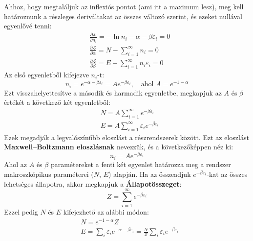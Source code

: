 \documentclass[../main.tex]{subfiles}
\begin{document}
Ahhoz, hogy megtaláljuk az inflexiós pontot (ami itt a maximum lesz), meg kell határoznunk a részleges deriváltakat az összes változó szerint, és ezeket nullával egyenlővé tenni:
\begin{equation}
    \begin{aligned}
        &\frac{\partial \mathcal{L}}{\partial n_i} = - \ln n_i - \alpha - \beta \varepsilon_i = 0 \\
        &\frac{\partial \mathcal{L}}{\partial \alpha} = N - \sum_{i = 1}^\infty n_i = 0 \\
        &\frac{\partial \mathcal{L}}{\partial \beta} = E - \sum_{i = 1}^\infty n_i \varepsilon_i = 0
    \end{aligned}
\end{equation}
Az első egyenletből kifejezve $n_i$-t:
\begin{equation}
    n_i = e^{- \alpha - \beta \varepsilon_i} = A e^{- \beta \varepsilon_i}, \quad \text{ahol } A = e^{-1 - \alpha}
\end{equation}
Ezt visszahelyettesítve a második és harmadik egyenletbe, megkapjuk az $A$ és $\beta$ értékét a következő két egyenletből:
\begin{equation}
    \begin{aligned}
        &N = A \sum_{i = 1}^\infty e^{- \beta \varepsilon_i} \\
        &E = A \sum_{i = 1}^\infty \varepsilon_i e^{- \beta \varepsilon_i}
    \end{aligned}
\end{equation}
Ezek megadják a legvalószínűbb eloszlást a részrendszerek között. Ezt az eloszlást \textbf{Maxwell–Boltzmann eloszlásnak} nevezzük, és a következőképpen néz ki:
\begin{equation}
    n_i = A e^{- \beta \varepsilon_i}
\end{equation}
Ahol az $A$ és $\beta$ paramétereket a fenti két egyenlet határozza meg a rendszer makroszkópikus paraméterei ($N$, $E$) alapján.
Ha az összeadjuk $e^{- \beta \varepsilon_i}$-kat az összes lehetséges állapotra, akkor megkapjuk a \textbf{Állapotösszeget}:
\begin{equation}
    Z = \sum_{i = 1}^\infty e^{- \beta \varepsilon_i}
\end{equation}
Ezzel pedig $N$ és $E$ kifejezhető az alábbi módon:
\begin{equation}
    \begin{aligned}
        &N = e^{-1 - \alpha} Z \\
        &E = \sum_i \varepsilon_i e^{- \alpha - \beta \varepsilon_i} = \frac{N}{Z} \sum_i \varepsilon_i e^{- \beta \varepsilon_i}
    \end{aligned}
\end{equation}
\end{document}
